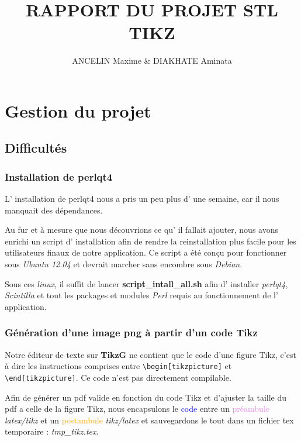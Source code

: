 \documentclass[a4paper]{report}
\title{RAPPORT DU PROJET STL \\ TIKZ}
\author{ANCELIN Maxime & DIAKHATE Aminata}
\begin{document}
 

\newenvironment{violetpar}{\color{violet}}{}
\newenvironment{bluepar}{\par\color{blue}}{\par}
\newenvironment{yellowpar}{\par\color{orange}}{\par}

\tableofcontents
\newpage

\titleformat{\chapter}[hang]{\bf\huge}{\thechapter}{2pc}{} 

\chapter {Gestion du projet}
\section{Difficultés}
\subsection{Installation de perlqt4}
L' installation de perlqt4 nous a pris un peu plus d' une semaine,
car il nous manquait des dépendances.

Au fur et à mesure que nous découvrions ce qu' il fallait ajouter,
nous avons enrichi un script d' installation afin de rendre la reinstallation
plus facile pour les utilisateurs finaux de notre application. Ce
script a été conçu pour fonctionner sous \textit{Ubuntu 12.04} et devrait marcher
sans encombre sous \textit{Debian}.

Sous ces \textit{linux}, il suffit de lancer \textbf{script\_intall\_all.sh}
afin d' installer \textit{perlqt4}, \textit{Scintilla} et tout les packages et modules
\textit{Perl} requis au fonctionnement de l' application.

\subsection{Génération d'une image png à partir d'un code Tikz}
Notre éditeur de texte sur \textbf{TikzG} ne contient que le code d'une figure Tikz, c'est à dire les instructions comprises entre \verb?\begin[tikzpicture]? et \verb?\end[tikzpicture]?. Ce code n'est pas directement compilable.

Afin de générer un pdf valide en fonction du code Tikz et d'ajuster la taille du pdf a celle de la figure Tikz, nous encapsulons le \textcolor{blue}{code} entre un \textcolor{violet}{préambule} \textit{latex/tikz} et un \textcolor{orange}{postambule} \textit{tikz/latex} et sauvegardons le tout dans un fichier tex temporaire : \textit{tmp\_tikz.tex}.
\end{document}
